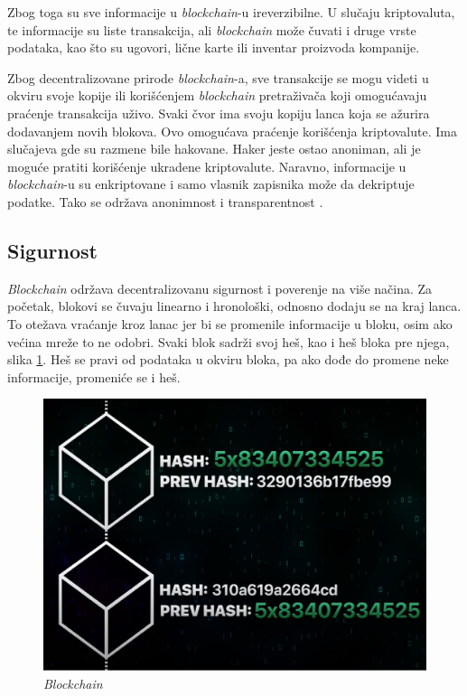 \documentclass[a4paper]{article}
\begin{document}
{Zbog toga su sve informacije u \emph{blockchain}-u ireverzibilne. U slučaju kriptovaluta, te informacije su liste transakcija, ali \emph{blockchain} može čuvati i druge vrste podataka, kao što su ugovori, lične karte ili inventar proizvoda kompanije.

Zbog decentralizovane prirode \emph{blockchain}-a, sve transakcije se mogu videti u okviru svoje kopije ili korišćenjem \emph{blockchain} pretraživača koji omogućavaju praćenje transakcija uživo. Svaki čvor ima svoju kopiju lanca koja se ažurira dodavanjem novih blokova. Ovo omogućava praćenje korišćenja kriptovalute. Ima slučajeva gde su razmene bile hakovane. Haker jeste ostao anoniman, ali je moguće pratiti korišćenje ukradene kriptovalute. Naravno, informacije u \emph{blockchain}-u su enkriptovane i samo vlasnik zapisnika može da dekriptuje podatke. Tako se održava anonimnost i transparentnost \cite{blockchain}.


\subsection{Sigurnost}
\label{subsec:sigurnost}
\emph{Blockchain} održava decentralizovanu sigurnost i poverenje na više načina. Za početak, blokovi se čuvaju linearno i hronološki, odnosno dodaju se na kraj lanca. To otežava vraćanje kroz lanac jer bi se promenile informacije u bloku, osim ako većina mreže to ne odobri. Svaki blok sadrži svoj heš, kao i heš bloka pre njega, slika \ref{fig:blockchain}. Heš se pravi od podataka u okviru bloka, pa ako dođe do promene neke informacije, promeniće se i heš.

\begin{figure}[h!]
\begin{center}
\includegraphics[scale=0.25]{slike/slika2.png}
\end{center}
\caption{\emph{Blockchain}}
\label{fig:blockchain}
\end{figure}


}
\end{document}
